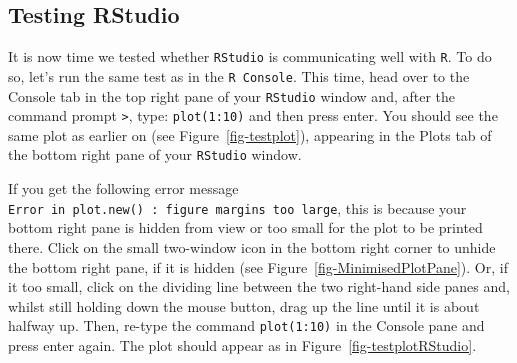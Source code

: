 \documentclass[
  letterpaper,
  DIV=11,
  numbers=noendperiod,
  oneside]{scrreprt}
\begin{document}
\subsection{Testing RStudio}\label{testing-rstudio}

It is now time we tested whether \texttt{RStudio} is communicating well
with \texttt{R}. To do so, let's run the same test as in the
\texttt{R\ Console}. This time, head over to the Console tab in the top
right pane of your \texttt{RStudio} window and, after the command prompt
\texttt{\textgreater{}}, type: \texttt{plot(1:10)} and then press enter.
You should see the same plot as earlier on (see
Figure~\ref{fig-testplot}), appearing in the Plots tab of the bottom
right pane of your \texttt{RStudio} window.

If you get the following error message
\texttt{Error\ in\ plot.new()\ :\ figure\ margins\ too\ large}, this is
because your bottom right pane is hidden from view or too small for the
plot to be printed there. Click on the small two-window icon in the
bottom right corner to unhide the bottom right pane, if it is hidden
(see Figure~\ref{fig-MinimisedPlotPane}). Or, if it too small, click on
the dividing line between the two right-hand side panes and, whilst
still holding down the mouse button, drag up the line until it is about
halfway up. Then, re-type the command \texttt{plot(1:10)} in the Console
pane and press enter again. The plot should appear as in
Figure~\ref{fig-testplotRStudio}.
\end{document}
